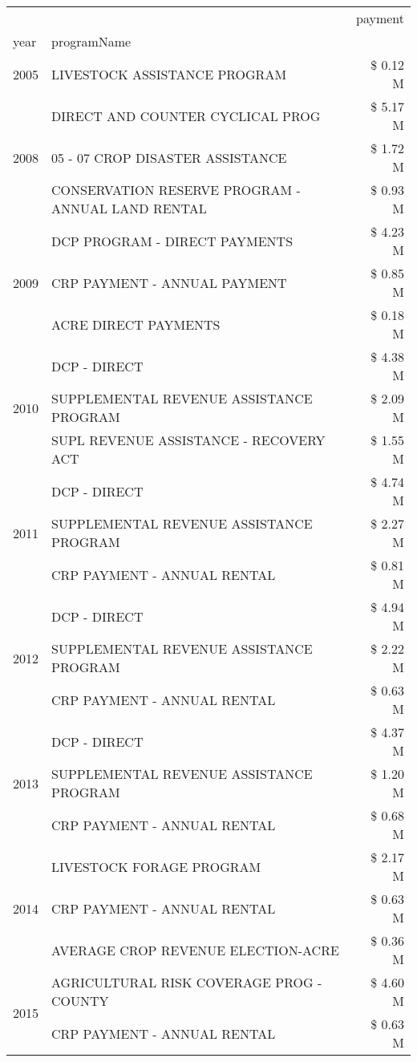 \begin{tabular}{llr}
\toprule
 &  & payment \\
year & programName &  \\
\midrule
2005 & LIVESTOCK ASSISTANCE PROGRAM & \$ 0.12 M \\
\cline{1-3}
\multirow[t]{3}{*}{2008} & DIRECT AND COUNTER CYCLICAL PROG & \$ 5.17 M \\
 & 05 - 07 CROP DISASTER ASSISTANCE & \$ 1.72 M \\
 & CONSERVATION RESERVE PROGRAM - ANNUAL LAND RENTAL & \$ 0.93 M \\
\cline{1-3}
\multirow[t]{3}{*}{2009} & DCP PROGRAM - DIRECT PAYMENTS & \$ 4.23 M \\
 & CRP PAYMENT - ANNUAL PAYMENT & \$ 0.85 M \\
 & ACRE DIRECT PAYMENTS & \$ 0.18 M \\
\cline{1-3}
\multirow[t]{3}{*}{2010} & DCP - DIRECT & \$ 4.38 M \\
 & SUPPLEMENTAL REVENUE ASSISTANCE PROGRAM & \$ 2.09 M \\
 & SUPL REVENUE ASSISTANCE - RECOVERY ACT & \$ 1.55 M \\
\cline{1-3}
\multirow[t]{3}{*}{2011} & DCP - DIRECT & \$ 4.74 M \\
 & SUPPLEMENTAL REVENUE ASSISTANCE PROGRAM & \$ 2.27 M \\
 & CRP PAYMENT - ANNUAL RENTAL & \$ 0.81 M \\
\cline{1-3}
\multirow[t]{3}{*}{2012} & DCP - DIRECT & \$ 4.94 M \\
 & SUPPLEMENTAL REVENUE ASSISTANCE PROGRAM & \$ 2.22 M \\
 & CRP PAYMENT - ANNUAL RENTAL & \$ 0.63 M \\
\cline{1-3}
\multirow[t]{3}{*}{2013} & DCP - DIRECT & \$ 4.37 M \\
 & SUPPLEMENTAL REVENUE ASSISTANCE PROGRAM & \$ 1.20 M \\
 & CRP PAYMENT - ANNUAL RENTAL & \$ 0.68 M \\
\cline{1-3}
\multirow[t]{3}{*}{2014} & LIVESTOCK FORAGE PROGRAM & \$ 2.17 M \\
 & CRP PAYMENT - ANNUAL RENTAL & \$ 0.63 M \\
 & AVERAGE CROP REVENUE ELECTION-ACRE & \$ 0.36 M \\
\cline{1-3}
\multirow[t]{3}{*}{2015} & AGRICULTURAL RISK COVERAGE PROG - COUNTY & \$ 4.60 M \\
 & CRP PAYMENT - ANNUAL RENTAL & \$ 0.63 M \\

\end{tabular}
